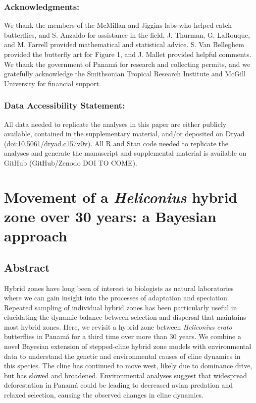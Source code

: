 \documentclass[]{article}
\begin{document}
\subsubsection{Acknowledgments:}\label{acknowledgments}

We thank the members of the McMillan and Jiggins labs who helped catch
butterflies, and S. Anzaldo for assistance in the field. J. Thurman, G.
LaRouque, and M. Farrell provided mathematical and statistical advice.
S. Van Belleghem provided the butterfly art for Figure 1, and J. Mallet
provided helpful comments. We thank the government of Panamá for
research and collecting permits, and we gratefully acknowledge the
Smithsonian Tropical Research Institute and McGill University for
financial support.

\subsubsection{Data Accessibility
Statement:}\label{data-accessibility-statement}

All data needed to replicate the analyses in this paper are either
publicly available, contained in the supplementary material, and/or
deposited on Dryad (\url{doi:10.5061/dryad.c157v0v}). All R and Stan
code needed to replicate the analyses and generate the manuscript and
supplemental material is available on GitHub (GitHub/Zenodo DOI TO
COME).

\pagebreak
{}

\linenumbers

\section{\texorpdfstring{Movement of a \textit{Heliconius} hybrid zone
over 30 years: a Bayesian
approach}{Movement of a  hybrid zone over 30 years: a Bayesian approach}}\label{movement-of-a-hybrid-zone-over-30-years-a-bayesian-approach-1}

\subsection{Abstract}\label{abstract}

Hybrid zones have long been of interest to biologists as natural
laboratories where we can gain insight into the processes of adaptation
and speciation. Repeated sampling of individual hybrid zones has been
particularly useful in elucidating the dynamic balance between selection
and dispersal that maintains most hybrid zones. Here, we revisit a
hybrid zone between \textit{Heliconius erato} butterflies in Panamá for
a third time over more than 30 years. We combine a novel Bayesian
extension of stepped-cline hybrid zone models with environmental data to
understand the genetic and environmental causes of cline dynamics in
this species. The cline has continued to move west, likely due to
dominance drive, but has slowed and broadened. Environmental analyses
suggest that widespread deforestation in Panamá could be leading to
decreased avian predation and relaxed selection, causing the observed
changes in cline dynamics.
\end{document}
